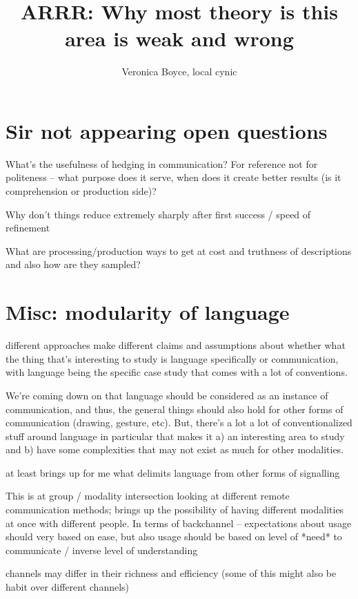 \documentclass[]{article}
\title{ARRR: Why most theory is this area is weak and wrong}
\author{Veronica Boyce, local cynic}
\begin{document}
\maketitle

\section{Sir not appearing open questions}

What's the usefulness of hedging in communication? For reference not for politeness -- what purpose does it serve, when does it create better results (is it comprehension or production side)? 

Why don't things reduce extremely sharply after first success / speed of refinement

What are processing/production ways to get at cost and truthness of descriptions and also how are they sampled? 



\section{Misc: modularity of language}
different approaches make different claims and assumptions about whether what the thing that's interesting to study is language specifically or communication, with language being the specific case study that comes with a lot of conventions. 

We're coming down on that language should be considered as an instance of communication, and thus, the general things should also hold for other forms of communication (drawing, gesture, etc). But, there's a lot a lot of conventionalized stuff around language in particular that makes it a) an interesting area to study and b) have some complexities that may not exist as much for other modalities. 

\cite{clark1996} at least brings up for me what delimits language from other forms of signalling

This is at group / modality intersection \cite{foxtree2013} looking at different remote communication methods; brings up the possibility of having different modalities at once with different people. In terms of backchannel -- expectations about usage should very based on ease, but also usage should be based on level of *need* to communicate / inverse level of understanding 

channels may differ in their richness and efficiency (some of this might also be habit over different channels)
\end{document}
